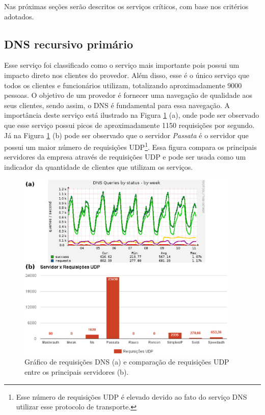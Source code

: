 Nas próximas seções serão descritos os serviços críticos, com base nos critérios adotados.

\subsection{DNS recursivo primário}
\label{section:dnsrecprim}

Esse serviço foi classificado como o serviço mais importante pois possui um impacto direto nos clientes do provedor. Além disso, esse é o único 
serviço que todos os clientes e funcionários utilizam, totalizando aproximadamente 9000 pessoas. O objetivo de um provedor é fornecer uma navegação 
de qualidade aos seus clientes, sendo assim, o \ac{DNS} é fundamental para essa navegação. A importância deste serviço está ilustrado na Figura 
\ref{fig:dns_udp} (a), onde pode ser observado que esse serviço possui picos de aproximadamente 1150 requisições por segundo. Já na Figura 
\ref{fig:dns_udp} (b) pode ser observado que o servidor \textit{Passata} é o servidor que possui um maior número de requisições 
\ac{UDP}\footnote[1]{Esse número de requisições \ac{UDP} é elevado devido ao fato do serviço \ac{DNS} utilizar esse protocolo de transporte.}. 
Essa figura compara os principais servidores da empresa através de requisições \ac{UDP} e pode ser usada como um indicador da quantidade de 
clientes que utilizam os serviços.

\begin{figure}[h!]
 \centering
 \includegraphics[width=400px]{img/dns_udp.eps}
 \caption{Gráfico de requisições DNS (a) e comparação de requisições UDP entre os principais servidores (b).}
 \label{fig:dns_udp}
\end{figure}

